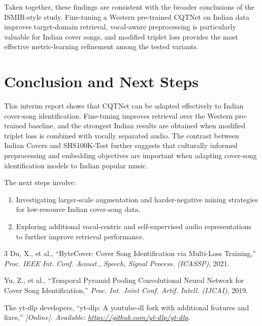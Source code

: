 \documentclass[conference]{IEEEtran}
\begin{document}
Taken together, these findings are consistent with the broader conclusions of the ISMIR-style study. Fine-tuning a Western pre-trained CQTNet on Indian data improves target-domain retrieval, vocal-aware preprocessing is particularly valuable for Indian cover songs, and modified triplet loss provides the most effective metric-learning refinement among the tested variants.

\section{Conclusion and Next Steps}
This interim report shows that CQTNet can be adapted effectively to Indian cover-song identification. Fine-tuning improves retrieval over the Western pre-trained baseline, and the strongest Indian results are obtained when modified triplet loss is combined with vocally separated audio. The contrast between Indian Covers and SHS100K-Test further suggests that culturally informed preprocessing and embedding objectives are important when adapting cover-song identification models to Indian popular music.

The next steps involve:
\begin{enumerate}
    \item Investigating larger-scale augmentation and harder-negative mining strategies for low-resource Indian cover-song data.
    \item Exploring additional vocal-centric and self-supervised audio representations to further improve retrieval performance.
\end{enumerate}

\begin{thebibliography}{3}
Du, X., et al., ``ByteCover: Cover Song Identification via Multi-Loss Training,'' \textit{Proc. IEEE Int. Conf. Acoust., Speech, Signal Process. (ICASSP)}, 2021.

Yu, Z., et al., ``Temporal Pyramid Pooling Convolutional Neural Network for Cover Song Identification,'' \textit{Proc. Int. Joint Conf. Artif. Intell. (IJCAI)}, 2019.

The yt-dlp developers, ``yt-dlp: A youtube-dl fork with additional features and fixes,'' \textit{[Online]. Available: \url{https://github.com/yt-dlp/yt-dlp}}.
\end{thebibliography}
\end{document}
